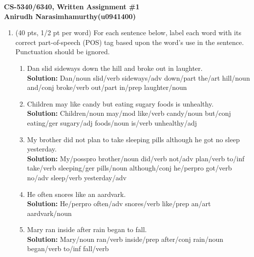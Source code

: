 \documentclass[11pt]{article}
\begin{document}
\large
\begin{center}
{\bf CS-5340/6340, Written Assignment \#1} \\
{\bf Anirudh Narasimhamurthy(u0941400)}
\end{center}
\normalsize

\begin{enumerate}  

\item (40 pts, 1/2 pt per word) For each sentence below, label each word with its
  correct part-of-speech (POS) tag based upon the word's use in the sentence.
  Punctuation should be ignored.


\begin{enumerate}

\item Dan slid sideways down the hill and broke out in laughter. \\
\textbf{Solution:} Dan/{\sc noun} slid/{\sc verb} sideways/{\sc adv} down/{\sc part} the/{\sc art} hill/{\sc noun} and/{\sc conj} broke/{\sc verb} out/{\sc part} in/{\sc prep} laughter/{\sc noun} \\

\item Children may like candy but eating sugary foods is unhealthy. \\
\textbf{Solution:} Children/{\sc noun} may/{\sc mod} like/{\sc verb} candy/{\sc noun} but/{\sc conj} eating/{\sc ger} sugary/{\sc adj} foods/{\sc noun} is/{\sc verb} unhealthy/{\sc adj} \\


\item My brother did not plan to  take sleeping pills although he got
  no sleep yesterday.  \\
  \textbf{Solution:} My/{\sc posspro} brother/{\sc noun} did/{\sc verb} not/{\sc adv} plan/{\sc verb} to/{\sc inf} take/{\sc verb} sleeping/{\sc ger} pills/{\sc noun} although/{\sc conj} he/{\sc perpro} got/{\sc verb} no/{\sc adv} sleep/{\sc verb} yesterday/{\sc adv}\\
  

\item He often snores like an aardvark.  \\
\textbf{Solution:} He/{\sc perpro} often/{\sc adv} snores/{\sc verb} like/{\sc prep} an/{\sc art} aardvark/{\sc noun}  \\


\item Mary ran inside after rain began to fall.  \\
\textbf{Solution:} Mary/{\sc noun} ran/{\sc verb} inside/{\sc prep} after/{\sc conj} rain/{\sc noun} began/{\sc verb} to/{\sc inf} fall/{\sc verb}\\



\end{enumerate}
\end{enumerate}
\end{document}
